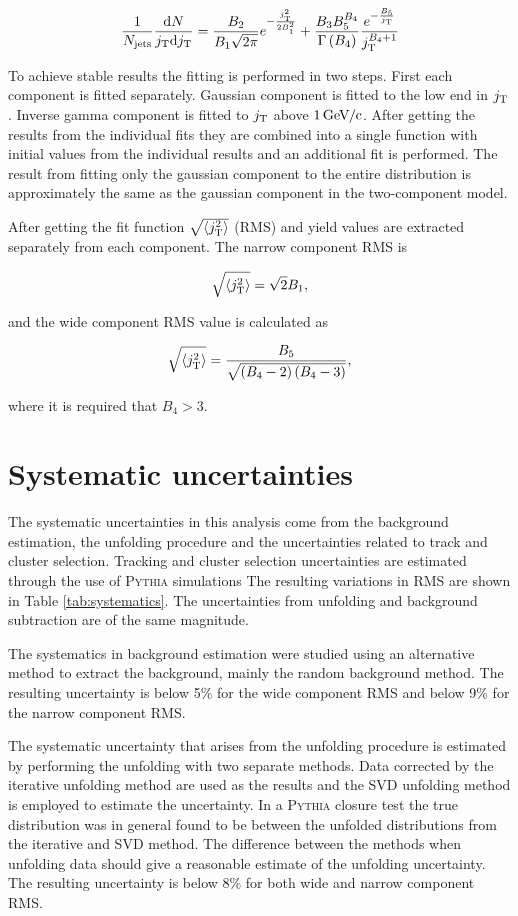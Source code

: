 \begin{equation}
\frac{1}{N_{\mathrm{jets}}}\frac{\mathrm{d}N}{j_{\rm T} \mathrm{d}j_{\rm T}} = \frac{B_2}{B_1\sqrt{2\pi}}e^{-\frac{j_{\rm T}^2}{2B_1^2}}+\frac{B_3B_5^{B_4}}{\Gamma\left(B_4\right)}\frac{e^{-\frac{B_5}{j_{\rm T}}}}{j_{\rm T}^{B_4+1}}
\label{eq:fit}
\end{equation}

To achieve stable results the fitting is performed in two steps. First each component is fitted separately. Gaussian component is fitted to the low end in $j_{\rm T}$. Inverse gamma component is fitted to $j_{\rm T}$ above $\unit[1]{\GeVc}$. After getting the results from the individual fits they are combined into a single function with initial values from the individual results and an additional fit is performed. The result from fitting only
the gaussian component to the entire distribution is approximately the same as the gaussian component in the two-component model.

After getting the fit function $\sqrt{\left<j_{\rm T}^2\right>}$ (RMS) and yield values are  extracted separately from each component. The narrow component RMS is

$$\sqrt{\left<j_{\rm T}^2\right>}=\sqrt{2}B_1,$$

and the wide component RMS value is calculated as

$$\sqrt{\left<j_{\rm T}^2\right>}=\frac{B_5}{\sqrt{\left(B_4-2\right)\left(B_4-3\right)}},$$

where it is required that $B_4 > 3$.

\section{Systematic uncertainties}
\label{sec:systematicerrors}
The systematic uncertainties in this analysis come from the background estimation, the unfolding procedure and the uncertainties related to track and cluster selection. Tracking and cluster selection uncertainties are estimated through the use of \textsc{Pythia} simulations The resulting variations in RMS are shown in Table \ref{tab:systematics}. The uncertainties from unfolding and background subtraction are of the same magnitude.

The systematics in background estimation were studied using an alternative method to extract the background, mainly the random background method. The resulting uncertainty is below 5\% for the wide component RMS and below 9\% for the narrow component RMS.

The systematic uncertainty that arises from the unfolding procedure is estimated by performing the unfolding with two separate methods. Data corrected by the iterative unfolding method are used as the results and the SVD unfolding method is employed to estimate the uncertainty. In a \textsc{Pythia} closure test the true distribution was in general found to be between the unfolded distributions from the iterative and SVD method. The difference between the methods when unfolding data should give a reasonable estimate of the unfolding uncertainty. The resulting uncertainty is below 8\% for both wide and narrow component RMS.

